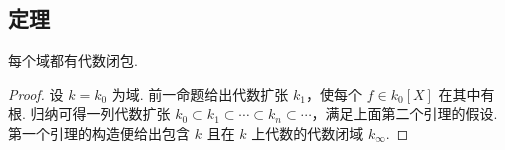 \subsection{定理}\label{sec:galois-2-2-5}
\begin{theorem*}
每个域都有代数闭包.
\end{theorem*}
\begin{proof}
设 $k=k_0$ 为域. 前一命题给出代数扩张 $k_1$，使每个 $f\in k_0[X]$ 在其中有根. 归纳可得一列代数扩张 $k_0\subset k_1\subset\cdots\subset k_n\subset\cdots$，满足上面第二个引理的假设. 第一个引理的构造便给出包含 $k$ 且在 $k$ 上代数的代数闭域 $k_\infty$.
\end{proof}




